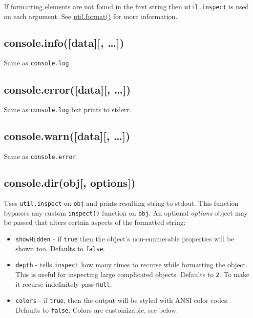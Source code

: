 If formatting elements are not found in the first string then
\texttt{util.inspect} is used on each argument. See
\href{util.html\#util_util_format_format}{util.format()} for more
information.

\subsection{console.info({[}data{]}{[},
\ldots{}{]})}\label{console.infodata}

Same as \texttt{console.log}.

\subsection{console.error({[}data{]}{[},
\ldots{}{]})}\label{console.errordata}

Same as \texttt{console.log} but prints to stderr.

\subsection{console.warn({[}data{]}{[},
\ldots{}{]})}\label{console.warndata}

Same as \texttt{console.error}.

\subsection{console.dir(obj{[},
options{]})}\label{console.dirobj-options}

Uses \texttt{util.inspect} on \texttt{obj} and prints resulting string
to stdout. This function bypasses any custom \texttt{inspect()} function
on \texttt{obj}. An optional \emph{options} object may be passed that
alters certain aspects of the formatted string:

\begin{itemize}
\item
  \texttt{showHidden} - if \texttt{true} then the object's
  non-enumerable properties will be shown too. Defaults to
  \texttt{false}.
\item
  \texttt{depth} - tells \texttt{inspect} how many times to recurse
  while formatting the object. This is useful for inspecting large
  complicated objects. Defaults to \texttt{2}. To make it recurse
  indefinitely pass \texttt{null}.
\item
  \texttt{colors} - if \texttt{true}, then the output will be styled
  with ANSI color codes. Defaults to \texttt{false}. Colors are
  customizable, see below.
\end{itemize}

